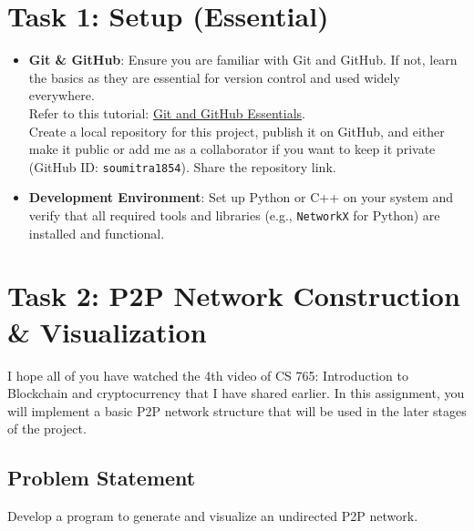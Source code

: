 \documentclass[12pt]{extarticle}
\begin{document}
\section*{Task 1: Setup (Essential)}
\begin{itemize}
    \item \textbf{Git \& GitHub}: Ensure you are familiar with Git and GitHub. If not, learn the basics as they are essential for version control and used widely everywhere.\\Refer to this tutorial: \href{https://youtu.be/tRZGeaHPoaw?si=KTOgtqin7e2d0rI8}{Git and GitHub Essentials}.\\ Create a local repository for this project, publish it on GitHub, and either make it public or add me as a collaborator if you want to keep it private (GitHub ID: \texttt{soumitra1854}). Share the repository link.
    \item \textbf{Development Environment}: Set up Python or C++ on your system and verify that all required tools and libraries (e.g., \texttt{NetworkX} for Python) are installed and functional.
\end{itemize}

\section*{Task 2: P2P Network Construction \& Visualization}
I hope all of you have watched the 4th video of CS 765: Introduction to Blockchain and cryptocurrency that I have shared earlier. In this assignment, you will implement a basic P2P network structure that will be used in the later stages of the project.
\subsection*{Problem Statement}
Develop a program to generate and visualize an undirected P2P network.
\end{document}

